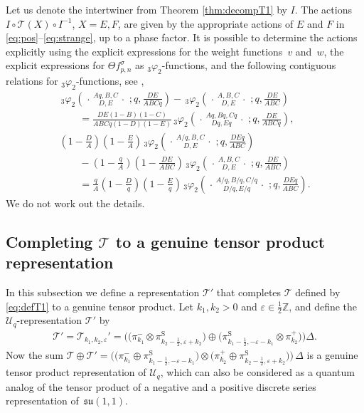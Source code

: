 \documentclass[pdftex]{sigma}
\numberwithin{equation}{section}
\numberwithin{theorem}{section}
\numberwithin{proposition}{section}
\numberwithin{lemma}{section}
\numberwithin{corollary}{section}
\numberwithin{definition}{section}
\numberwithin{example}{section}
\numberwithin{remark}{section}
\numberwithin{note}{section}
\newcommand{\Z}{\mathbb Z}
\newcommand{\eps}{\varepsilon}
\newcommand{\rphis}[5]{\,_{#1}\varphi_{#2} \left( \genfrac{.}{.}{0pt}{}{#3}{#4}
\ ;#5 \right)}
\newcommand{\su}{\mathfrak{su}}
\newcommand{\U}{\mathcal U}
\begin{document}
Let us denote the intertwiner from Theorem \ref{thm:decompT1} by $I$. The actions $I\circ \mathcal T(X)\circ I^{-1}$, $X=E,F$, are given by the appropriate actions of $E$ and $F$ in \eqref{eq:pos}--\eqref{eq:strange}, up to a phase factor. It is possible to determine the actions explicitly using the explicit expressions for the weight functions~$v$ and~$w$, the explicit expressions for $\Theta f_{p,n}^\sigma$ as $_3\varphi_2$-functions, and the following contiguous relations for $_3\varphi_2$-functions, see \cite[(2.3), (2.4)]{GIM96},
\begin{gather*}
\rphis{3}{2}{Aq,B,C}{D,E}{q,\frac{DE}{ABCq}} - \rphis{3}{2}{A,B,C}{D,E}{q,\frac{DE}{ABC}}  \\
\qquad{}=\frac{DE(1-B)(1-C)}{ABCq(1-D)(1-E)} \rphis{3}{2}{Aq,Bq,Cq}{Dq,Eq}{q,\frac{DE}{ABCq}},
\\
\left(1-\frac{D}{A}\right)\left(1-\frac{E}{A}\right) \rphis{3}{2}{A/q,B,C}{D,E}{q,\frac{DEq}{ABC}} \\
\qquad{} -\left(1-\frac{q}{A}\right)\left(1-\frac{DE}{ABC}\right)\rphis{3}{2}{A,B,C}{D,E}{q,\frac{DE}{ABC}}
\\
\qquad{}=\frac{q}{A}\left(1-\frac{D}{q} \right) \left(1-\frac{E}{q} \right)\rphis{3}{2}{A/q,B/q,C/q}{D/q,E/q}{q,\frac{DEq}{ABC}}.
\end{gather*}
We do not work out the details.

\subsection[Completing $\mathcal T$ to a genuine tensor product representation]{Completing $\boldsymbol{\mathcal T}$ to a genuine tensor product representation}

In this subsection we def\/ine a representation $\mathcal T'$ that completes $\mathcal T$ def\/ined by \eqref{eq:defT1} to a genuine tensor product. Let $k_1,k_2>0$ and $\eps \in \frac12\Z$, and def\/ine the $\U_q$-representation $\mathcal T'$ by
\begin{gather*} %
\mathcal T' = \mathcal T_{k_1,k_2,\eps}'= \Big( \big(\pi^-_{k_1}\otimes \pi^{\mathrm S}_{k_2-\frac12,\eps+k_2} \big)\oplus \big( \pi^{\mathrm S}_{k_1-\frac12,-\eps-k_1} \otimes \pi^+_{k_2}\big)\Big)  \Delta.
\end{gather*}
Now the sum $\mathcal T \oplus \mathcal T'=\Big( \big(\pi^-_{k_1}\oplus \pi^{\mathrm S}_{k_1-\frac12,-\eps-k_1}\big) \otimes \big( \pi^+_{k_2} \oplus\pi^{\mathrm S}_{k_2-\frac12,\eps+k_2} \big)\Big)\, \Delta$ is a genuine tensor product representation of $\U_q$, which can also be considered as a quantum analog of the tensor product of a negative and a positive discrete series representation of~$\su(1,1)$.
\end{document}
